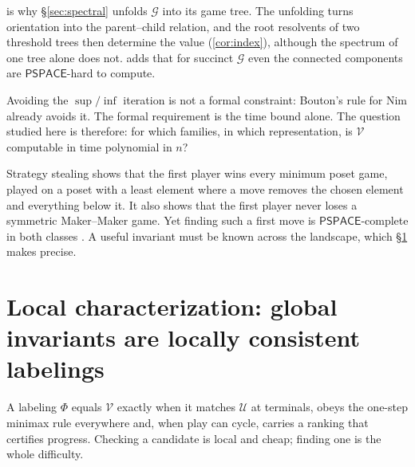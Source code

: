 \documentclass[final]{siamart0516}
\numberwithin{theorem}{section}
\numberwithin{equation}{section}
\theoremstyle{siamnonum}
\theoremstyle{plain}
\newcommand{\val}{\mathcal{V}}            %
\newcommand{\pay}{\mathcal{U}}            %
\newcommand{\SG}{\mathcal{G}}             %
\newcommand{\cls}[1]{\mathsf{#1}}
\newcommand{\PSPACE}{\cls{PSPACE}}
\begin{document}
 is why \S\ref{sec:spectral} unfolds $\SG$ into its game tree. The unfolding turns orientation into the parent--child relation, and the root resolvents of two threshold trees then determine the value (\cref{cor:index}), although the spectrum of one tree alone does not.  adds that for succinct $\SG$ even the connected components are $\PSPACE$-hard to compute.

\begin{remark}\label{rem:bypass}
Avoiding the $\sup/\inf$ iteration is not a formal constraint: Bouton's rule for Nim already avoids it. The formal requirement is the time bound alone. The question studied here is therefore: for which families, in which representation, is $\val$ computable in time polynomial in $n$?
\end{remark}

\begin{remark}\label{rem:strategy-stealing}
Strategy stealing shows that the first player wins every minimum poset game, played on a poset with a least element where a move removes the chosen element and everything below it. It also shows that the first player never loses a symmetric Maker--Maker game. Yet finding such a first move is $\PSPACE$-complete in both classes \cite{BodwinGrossman}. A useful invariant must be known across the landscape, which \S\ref{sec:local} makes precise.
\end{remark}

\section{Local characterization: global invariants are locally consistent labelings}\label{sec:local}

A labeling $\Phi$ equals $\val$ exactly when it matches $\pay$ at terminals, obeys the one-step minimax rule everywhere and, when play can cycle, carries a ranking that certifies progress. Checking a candidate is local and cheap; finding one is the whole difficulty.
\end{document}
